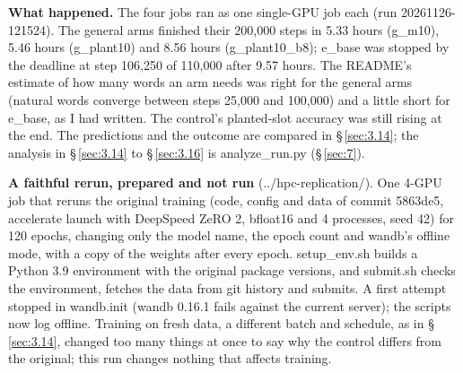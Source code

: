 \documentclass[paper=a4,fontsize=11pt,DIV=11,parskip=half,headings=small,numbers=noendperiod]{scrartcl}
\DeclareRobustCommand{\lead}[1]{\textsf{\bfseries\color{accent}#1}}
\DeclareRobustCommand{\code}[1]{{\fontseries{m}\ttfamily #1}}
\begin{document}
{\raggedright \lead{What happened.} The four jobs ran as one single-GPU job each (run 20261126-121524). The
general arms finished their 200,000 steps in 5.33 hours (\code{g\_\allowbreak{}m10}), 5.46 hours
(\code{g\_\allowbreak{}plant10}) and 8.56 hours (\code{g\_\allowbreak{}plant10\_\allowbreak{}b8});
\code{e\_\allowbreak{}base} was stopped by the deadline at step 106,250 of 110,000 after 9.57 hours. The
README’s estimate of how many words an arm needs was right for the general arms (natural words converge between
steps 25,000 and 100,000) and a little short for \code{e\_\allowbreak{}base}, as I had written. The control’s
planted-slot accuracy was still rising at the end. The predictions and the outcome are compared in
\S\,\ref{sec:3.14}; the analysis in \S\,\ref{sec:3.14} to \S\,\ref{sec:3.16} is
\code{analyze\_\allowbreak{}run.\allowbreak{}py} (\S\,\ref{sec:7}).\par}

{\raggedright \lead{A faithful rerun, prepared and not run}
(\code{../\allowbreak{}hpc-\allowbreak{}replication/}). One 4-GPU job that reruns the original training (code,
config and data of commit \code{5863de5}, \code{accelerate launch} with DeepSpeed ZeRO 2, bfloat16 and 4
processes, seed 42) for 120 epochs, changing only the model name, the epoch count and wandb’s offline mode, with
a copy of the weights after every epoch. \code{setup\_\allowbreak{}env.\allowbreak{}sh} builds a Python 3.9
environment with the original package versions, and \code{submit.\allowbreak{}sh} checks the environment,
fetches the data from git history and submits. A first attempt stopped in \code{wandb.\allowbreak{}init} (wandb
0.16.1 fails against the current server); the scripts now log offline. Training on fresh data, a different batch
and schedule, as in \S\,\ref{sec:3.14}, changed too many things at once to say why the control differs from the
original; this run changes nothing that affects training.\par}

\end{document}
